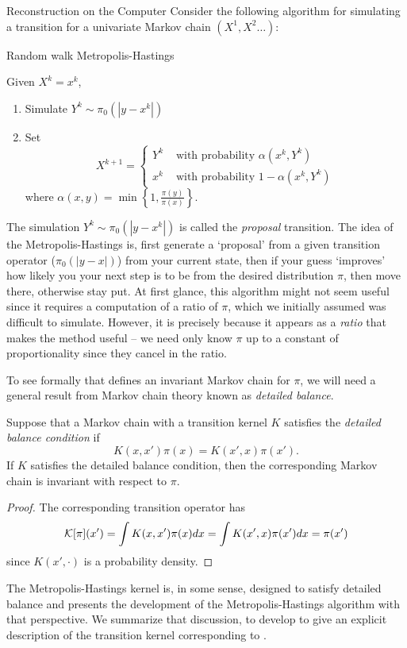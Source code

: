 \begin{chapter}{Reconstruction on the Computer}
Consider the following algorithm for simulating a transition for a univariate Markov chain $(X^1,X^2\dots)$:
\begin{algorithm}[H]
\caption{Random walk Metropolis-Hastings} \label{alg:metropolis}
Given $X^k = x^{k}$, 
\begin{enumerate}[1.]
  \item Simulate $Y^k \sim \pi_0(|y - x^{k}|)$
  \item Set
  \begin{equation*}
    X^{k+1} = \begin{cases}
      Y^k &\text{ with probability } \alpha(x^{k},Y^k) \\
      x^k &\text{ with probability } 1-\alpha(x^{k},Y^k)
    \end{cases} 
  \end{equation*}
  where $\displaystyle{\alpha(x,y) = \min\left\{1,\frac{\pi(y)}{\pi(x)}\right\}.}$ 
\end{enumerate}
\end{algorithm} 

The simulation $Y^k\sim \pi_0(|y-x^k|)$ is called the \emph{proposal} transition.
The idea of the Metropolis-Hastings is, first generate a `proposal' from a given transition operator ($\pi_0(|y-x|)$) from your current state, then if your guess `improves' how likely you your next step is to be from the desired distribution $\pi$, then move there, otherwise stay put.
At first glance, this algorithm might not seem useful since it requires a computation of a ratio of $\pi$, which we initially assumed was difficult to simulate.
However, it is precisely because it appears as a \emph{ratio} that makes the method useful -- we need only know $\pi$ up to a constant of proportionality since they cancel in the ratio.

To see formally that  defines an invariant Markov chain for $\pi$, we will need a general result from Markov chain theory known as \emph{detailed balance}.
\begin{thm}
  Suppose that a Markov chain with a transition kernel $K$ satisfies the \emph{detailed balance condition} if
  \begin{equation} \label{eq:detailedBalance}
    K(x,x')\pi(x) = K(x',x) \pi(x').
  \end{equation}
  If $K$ satisfies the detailed balance condition, then the corresponding Markov chain is invariant with respect to $\pi$.
\end{thm}
\begin{proof}
  The corresponding transition operator has
  \begin{equation}
    \mathcal K[\pi](x') = \int K(x,x') \pi(x)dx = \int K(x',x)\pi(x')dx = \pi(x')
  \end{equation}
  since $K(x',\cdot)$ is a probability density.
\end{proof}
The Metropolis-Hastings kernel is, in some sense, designed to satisfy detailed balance and \citep{calvetti2007introduction} presents the development of the Metropolis-Hastings algorithm with that perspective.
We summarize that discussion, to develop to give an explicit description of the transition kernel corresponding to .


\end{chapter}
